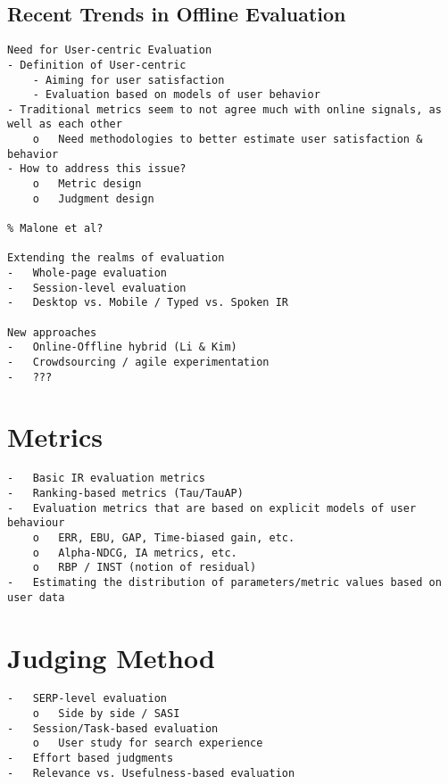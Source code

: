 \documentclass[openany]{now} %
\begin{document}
\cite{INR-009} \cite{borlund2003} \cite{cleverdon67}

\section{Recent Trends in Offline Evaluation}

\begin{verbatim}
Need for User-centric Evaluation
- Definition of User-centric
	- Aiming for user satisfaction
	- Evaluation based on models of user behavior
- Traditional metrics seem to not agree much with online signals, as well as each other
	o	Need methodologies to better estimate user satisfaction & behavior
- How to address this issue?
	o	Metric design
	o	Judgment design

% Malone et al?

Extending the realms of evaluation
-	Whole-page evaluation
-	Session-level evaluation
-	Desktop vs. Mobile / Typed vs. Spoken IR

New approaches
-	Online-Offline hybrid (Li & Kim)
-	Crowdsourcing / agile experimentation
-	???

\end{verbatim}

\chapter{Metrics}

\begin{verbatim}
-	Basic IR evaluation metrics 
-	Ranking-based metrics (Tau/TauAP)
-	Evaluation metrics that are based on explicit models of user behaviour
	o	ERR, EBU, GAP, Time-biased gain, etc.
	o	Alpha-NDCG, IA metrics, etc.
	o	RBP / INST (notion of residual)
-	Estimating the distribution of parameters/metric values based on user data
\end{verbatim}

\chapter{Judging Method}

\begin{verbatim}
-	SERP-level evaluation 
	o	Side by side / SASI
-	Session/Task-based evaluation
	o	User study for search experience
-	Effort based judgments 
-	Relevance vs. Usefulness-based evaluation 
\end{verbatim}

\cite{Thomas2006}
\cite{Chandar2013} \cite{Al-Maskari2007} \cite{Bailey2010} \cite{CarteretteBCD08}
\end{document}
